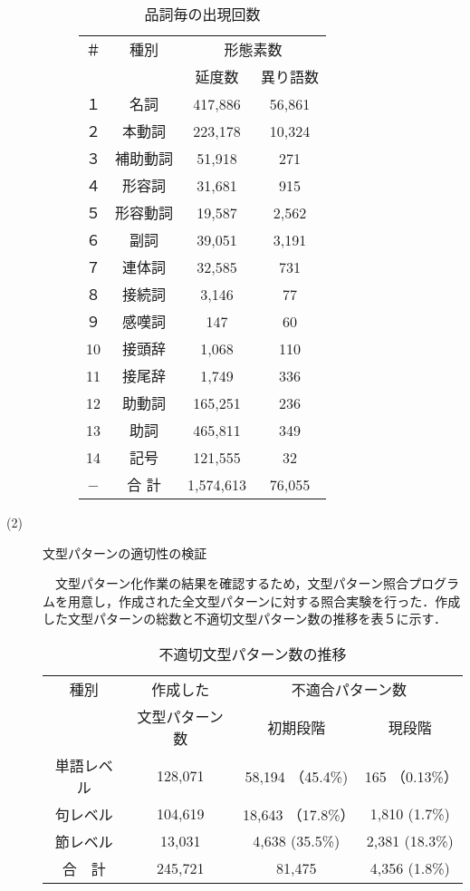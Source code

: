 \documentclass{nlp}
\begin{document}
\begin{description}
\begin{description}
\begin{table}[!htbp]
\footnotesize
\begin{center}
\caption{品詞毎の出現回数}
\begin{tabular}{|c|c|c|c|}
\hline
＃ & 種別 & \multicolumn{2}{|c|}{形態素数 } \\ \cline{3-4}
 & & 延度数 & 異り語数 \\ \hline
１ & 名詞 & 417,886 & 56,861 \\ \hline
２ & 本動詞 & 223,178 & 10,324 \\ \hline
３ & 補助動詞 & 51,918 & 271 \\ \hline
４ & 形容詞 & 31,681 & 915 \\ \hline
５ & 形容動詞 & 19,587 & 2,562 \\ \hline
６ & 副詞 & 39,051 & 3,191 \\ \hline
７ & 連体詞 & 32,585 & 731 \\ \hline
８ & 接続詞 & 3,146 & 77 \\ \hline
９ & 感嘆詞 & 147 & 60 \\ \hline    
10 & 接頭辞 & 1,068 & 110 \\ \hline
11 & 接尾辞 & 1,749 & 336 \\ \hline
12 & 助動詞 & 165,251 & 236 \\ \hline
13 & 助詞   & 465,811 & 349 \\ \hline
14 & 記号 & 121,555 & 32 \\ \hline
− & 合 計  & 1,574,613 & 76,055 \\ \hline
\end{tabular}
\end{center}
\end{table}
    
\end{description}

\item[(2)] 文型パターンの適切性の検証 

　文型パターン化作業の結果を確認するため，文型パターン照合プログラムを用意し，作成された全文型パターンに対する照合実験を行った．作成した文型パターンの総数と不適切文型パターン数の推移を表５に示す．

\begin{table}[!htbp]
\footnotesize
\begin{center}
\caption{不適切文型パターン数の推移}
\begin{tabular}{|c|c|c|c|}
\hline
種別 & 作成した & \multicolumn{2}{|c|}{不適合パターン数 } \\ \cline{3-4}
 & 文型パターン数 & 初期段階 & 現段階 \\ \hline
単語レベル & 128,071 & 58,194 （45.4\%) & 165 （0.13\%）\\ \hline
句レベル & 104,619 & 18,643 （17.8\%）& 1,810  (1.7\%) \\ \hline
節レベル & 13,031 & 4,638  (35.5\%) & 2,381  (18.3\%) \\ \hline
合　計 & 245,721 & 81,475 & 4,356  (1.8\%) \\ \hline
\end{tabular}
\end{center}
\end{table}



\end{description}
\end{document}
